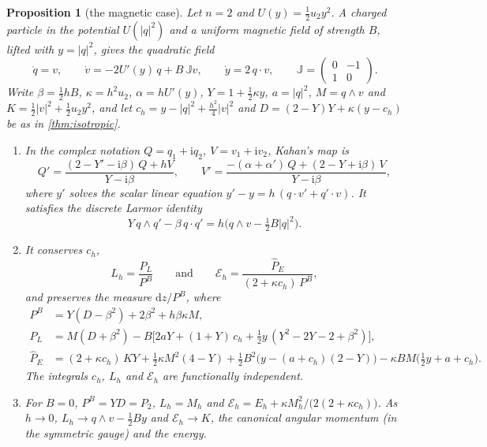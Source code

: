 \documentclass[11pt,a4paper]{article}
\newtheorem{proposition}[theorem]{Proposition}
\theoremstyle{definition}
\theoremstyle{remark}
\newcommand{\dd}{\mathrm{d}}
\newcommand{\Jq}{\mathbb{J}}
\begin{document}
\begin{proposition}[the magnetic case]\label{prop:magnetic}
Let $n=2$ and $U(y)=\frac12u_2y^2$. A charged particle in the potential $U(\lvert q\rvert^2)$ and a uniform
magnetic field of strength $B$, lifted with $y=\lvert q\rvert^2$, gives the quadratic field
\begin{equation}\label{eq:magfield}
\dot q=v,\qquad\dot v=-2U'(y)\,q+B\,\Jq v,\qquad\dot y=2\,q\cdot v,\qquad
\Jq=\begin{pmatrix}0&-1\\1&0\end{pmatrix}.
\end{equation}
Write $\beta=\frac12hB$, $\kappa=h^2u_2$, $\alpha=hU'(y)$, $Y=1+\frac12\kappa y$, $a=\lvert q\rvert^2$,
$M=q\wedge v$ and $K=\frac12\lvert v\rvert^2+\frac12u_2y^2$, and let
$c_h=y-\lvert q\rvert^2+\frac{h^2}4\lvert v\rvert^2$ and $D=(2-Y)Y+\kappa(y-c_h)$ be as in \cref{thm:isotropic}.
\begin{enumerate}[label=(\alph*)]
\item In the complex notation $Q=q_1+\mathrm iq_2$, $V=v_1+\mathrm iv_2$, Kahan's map is
\[
Q'=\frac{(2-Y'-\mathrm i\beta)\,Q+hV}{Y-\mathrm i\beta},\qquad
V'=\frac{-(\alpha+\alpha')\,Q+(2-Y+\mathrm i\beta)\,V}{Y-\mathrm i\beta},
\]
where $y'$ solves the scalar linear equation $y'-y=h\,(q\cdot v'+q'\cdot v)$. It satisfies the discrete Larmor
identity
\begin{equation}\label{eq:larmor}
Y\,q\wedge q'-\beta\,q\cdot q'=h\big(q\wedge v-\tfrac12B\lvert q\rvert^2\big).
\end{equation}
\item It conserves $c_h$,
\[
L_h=\frac{P_L}{P^B}\qquad\text{and}\qquad\mathcal E_h=\frac{\hat P_E}{(2+\kappa c_h)\,P^B},
\]
and preserves the measure $\dd z/P^B$, where
\begin{align*}
P^B&=Y(D-\beta^2)+2\beta^2+h\beta\kappa M,\\
P_L&=M(D+\beta^2)-B\big[2aY+(1+Y)\,c_h+\tfrac12y\,(Y^2-2Y-2+\beta^2)\big],\\
\hat P_E&=(2+\kappa c_h)\,KY+\tfrac12\kappa M^2(4-Y)+\tfrac12B^2\big(y-(a+c_h)(2-Y)\big)
-\kappa BM\big(\tfrac12y+a+c_h\big).
\end{align*}
The integrals $c_h$, $L_h$ and $\mathcal E_h$ are functionally independent.
\item For $B=0$, $P^B=YD=P_2$, $L_h=M_h$ and $\mathcal E_h=E_h+\kappa M_h^2/\big(2(2+\kappa c_h)\big)$. As
$h\to0$, $L_h\to q\wedge v-\frac12By$ and $\mathcal E_h\to K$, the canonical angular momentum (in the symmetric
gauge) and the energy.
\end{enumerate}
\end{proposition}
\end{document}
